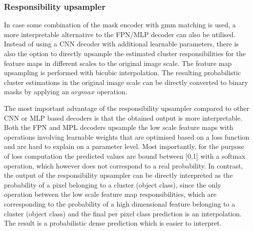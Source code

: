 \subsubsection{Responsibility upsampler}
In case some combination of the mask encoder with gmm matching is used, a more interpretable alternative to the FPN/MLP decoder can also be utilised. Instead of using a CNN decoder with additional learnable parameters, there is also the option to directly upsample the estimated cluster responsibilities for the feature maps in different scales to the original image scale. The feature map upsampling is performed with bicubic interpolation.
The resulting probabilistic cluster estimations in the original image scale can be directly converted to binary masks by applying an $argmax$ 
operation. \par 
The most important advantage of the responsibility upsampler compared to other CNN or MLP based decoders is that the obtained output is more interpretable. Both the FPN and MPL decoders upsample the low scale feature maps with operations involving learnable weights that are optimised based on a loss function and are hard to explain on a parameter level. Most importantly, for the purpose of loss computation the predicted values are bound between [0,1] with a softmax operation, which however does not correspond to a real probability. In contrast, the output of the responsibility upsampler can be directly interpreted as the probability of a pixel belonging to a cluster (object class), since the only operation between the low scale feature map responsibilities, which are corresponding to the probability of a high dimensional feature belonging to a cluster (object class) and the final per pixel class prediction is an interpolation. The result is a probabilistic dense prediction which is easier to interpret.
\par



